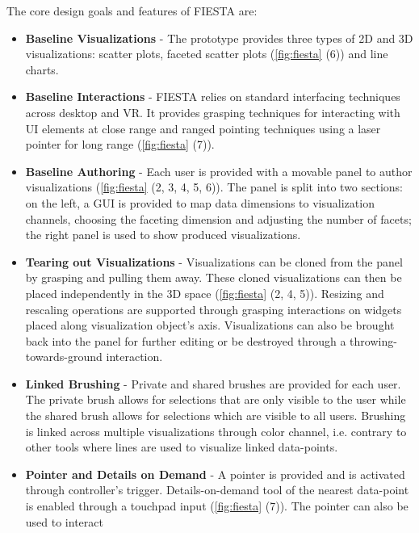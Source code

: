 \documentclass{vgtc}                          %
\begin{document}
\medskip

\noindent The core design goals and features of FIESTA are:
\begin{itemize}
	\item \textbf{Baseline Visualizations} - The prototype provides three types
	      of 2D and 3D visualizations: scatter plots, faceted scatter plots
	      (\autoref{fig:fiesta} (6)) and line charts.
	\item \textbf{Baseline Interactions} - FIESTA relies on standard
	      interfacing techniques across desktop and VR. It provides grasping
	      techniques for interacting with UI elements at close range and ranged
	      pointing techniques using a laser pointer for long range
	      (\autoref{fig:fiesta} (7)).
	\item \textbf{Baseline Authoring} - Each user is provided with a movable
	      panel to author visualizations (\autoref{fig:fiesta} (2, 3, 4, 5, 6)).
	      The panel is split into two sections: on the left, a GUI is provided
	      to map data dimensions to visualization channels, choosing the
	      faceting dimension and adjusting the number of facets; the right
	      panel is used to show produced visualizations.
	\item \textbf{Tearing out Visualizations} - Visualizations can be cloned
	      from the panel by grasping and pulling them away. These cloned
	      visualizations can then be placed independently in the 3D space
	      (\autoref{fig:fiesta} (2, 4, 5)). Resizing and rescaling operations are
	      supported through grasping interactions on widgets placed along
	      visualization object's axis. Visualizations can also be brought back
	      into the panel for further editing or be destroyed through a
	      throwing-towards-ground interaction.
	\item \textbf{Linked Brushing} - Private and shared brushes are provided
	      for each user. The private brush allows for selections that are only
	      visible to the user while the shared brush allows for selections
	      which are visible to all users. Brushing is linked across multiple
	      visualizations through color channel, i.e. contrary to other tools
	      where lines are used to visualize linked data-points.
	\item \textbf{Pointer and Details on Demand} - A pointer is provided and is
	      activated through controller's trigger. Details-on-demand tool of the
	      nearest data-point is enabled through a touchpad input
	      (\autoref{fig:fiesta} (7)). The pointer can also be used to interact

\end{itemize}
\end{document}
